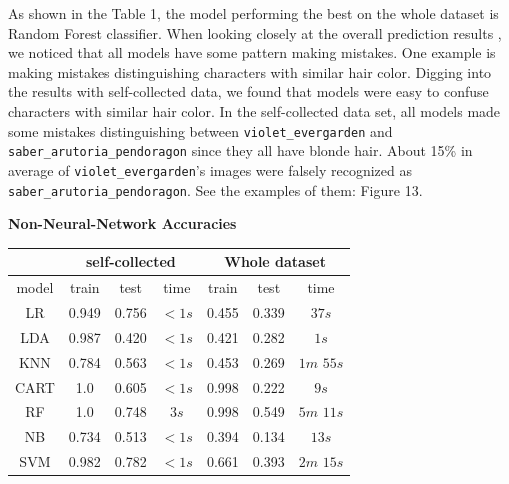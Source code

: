 \documentclass[11.5pt]{article}
\begin{document}
\begin{enumerate}
\begin{itemize}
            \begin{minipage}{0.45\textwidth}
                As shown in the Table 1, the model performing the best on the whole dataset is Random Forest classifier. When looking closely at the overall prediction results , we noticed that all models have some pattern making mistakes.
                One example is making mistakes distinguishing characters with similar hair color.
                Digging into the results with self-collected data, we found that models were easy to confuse characters with similar hair color.
                In the self-collected data set, all models made some mistakes distinguishing between \texttt{violet\_evergarden} and \texttt{saber\_arutoria\_pendoragon} since they all have blonde hair.
                About 15\% in average of \texttt{violet\_evergarden}'s images were falsely recognized as \texttt{saber\_arutoria\_pendoragon}.
                See the examples of them: Figure 13.
            \end{minipage}
            \begin{minipage}{0.3\textwidth}
                \begin{center}
                    \textbf{Non-Neural-Network Accuracies}
                \end{center}
                \begin{tabular}{|c|c|c|c|c|c|c|}
                    \hline
                     & \multicolumn{3}{|c|}{self-collected} & \multicolumn{3}{|c|}{Whole dataset} \\ \hline
                    model & train & test & time & train & test & time \\ \hline
                    LR & 0.949 & 0.756 & $<1s$ & 0.455 & 0.339 & $37s$ \\ \hline
                    LDA  & 0.987 & 0.420 & $<1s$ & 0.421 & 0.282 & $1s$ \\ \hline
                    KNN & 0.784 & 0.563 & $<1s$ & 0.453 & 0.269 & $1m$ $55s$ \\ \hline
                    CART & 1.0 & 0.605 & $<1s$ & 0.998 & 0.222 & $9s$ \\ \hline
                    RF & 1.0 & 0.748 & $3s$ & 0.998 & 0.549 & $5m$ $11s$\\ \hline
                    NB & 0.734 & 0.513 & $<1s$ & 0.394 & 0.134 & $13s$ \\ \hline
                    SVM  & 0.982 & 0.782 & $<1s$ & 0.661 & 0.393 & $2m$ $15s$ \\ \hline
                \end{tabular}
            \end{minipage}
            

\end{itemize}
\end{enumerate}
\end{document}
